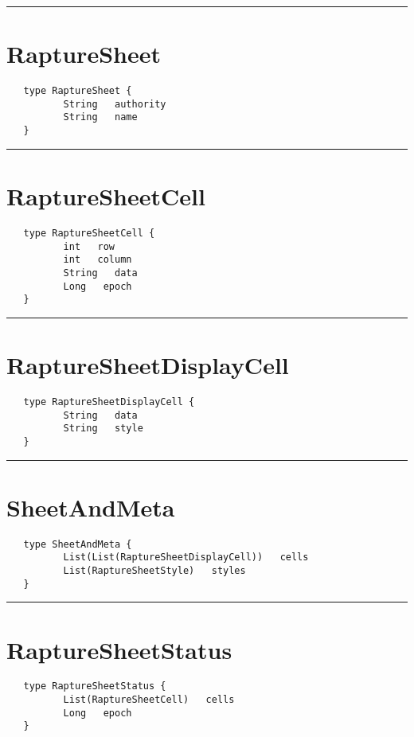 \rule{15cm}{2pt}
\section{RaptureSheet}
\label{type:RaptureSheet}

\begin{verbatim}
   type RaptureSheet {
          String   authority
          String   name
   }
\end{verbatim}

\rule{15cm}{2pt}
\section{RaptureSheetCell}
\label{type:RaptureSheetCell}

\begin{verbatim}
   type RaptureSheetCell {
          int   row
          int   column
          String   data
          Long   epoch
   }
\end{verbatim}

\rule{15cm}{2pt}
\section{RaptureSheetDisplayCell}
\label{type:RaptureSheetDisplayCell}

\begin{verbatim}
   type RaptureSheetDisplayCell {
          String   data
          String   style
   }
\end{verbatim}

\rule{15cm}{2pt}
\section{SheetAndMeta}
\label{type:SheetAndMeta}

\begin{verbatim}
   type SheetAndMeta {
          List(List(RaptureSheetDisplayCell))   cells
          List(RaptureSheetStyle)   styles
   }
\end{verbatim}

\rule{15cm}{2pt}
\section{RaptureSheetStatus}
\label{type:RaptureSheetStatus}

\begin{verbatim}
   type RaptureSheetStatus {
          List(RaptureSheetCell)   cells
          Long   epoch
   }
\end{verbatim}


